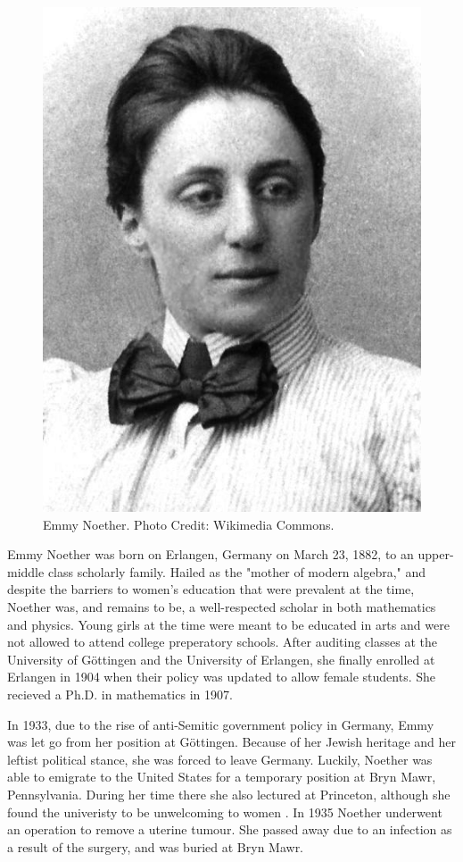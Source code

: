\documentclass[../../../include/open-logic-section]{subfiles}
\begin{document}

\begin{figure}[h!] 
\centering
\includegraphics[scale=0.5]{emmy-noether.png} 
\caption{Emmy Noether. Photo Credit: Wikimedia Commons.} 
\end{figure}
Emmy Noether was born on Erlangen, Germany on March 23, 1882,
to an upper-middle class scholarly family. Hailed as the "mother of modern
algebra," and despite the barriers to women's
education that were prevalent at the time, Noether was, and remains to be,
a well-respected scholar in both mathematics and physics. Young girls at the
time were meant to be educated in arts and were not allowed to attend
college preperatory schools. After auditing classes at the University
of G\"{o}ttingen and the University of Erlangen, she finally enrolled at Erlangen
in 1904 when their policy was updated to allow female students. She recieved
a Ph.D. in mathematics in 1907.



In 1933, due to the rise of anti-Semitic government policy in Germany, Emmy
was let go from her position at G\"{o}ttingen. Because of her Jewish heritage
and her leftist political stance, she was forced to leave Germany. Luckily, Noether
 was able to emigrate
to the United States for a temporary position at Bryn Mawr, Pennsylvania. During
her time there she also lectured at Princeton, although she found the univeristy to
be unwelcoming to women \citep[81]{dick1981}. In 1935 Noether underwent an
operation to remove a uterine tumour. She passed away due to an infection as 
a result of the surgery, and was buried at Bryn Mawr.
\end{document}
